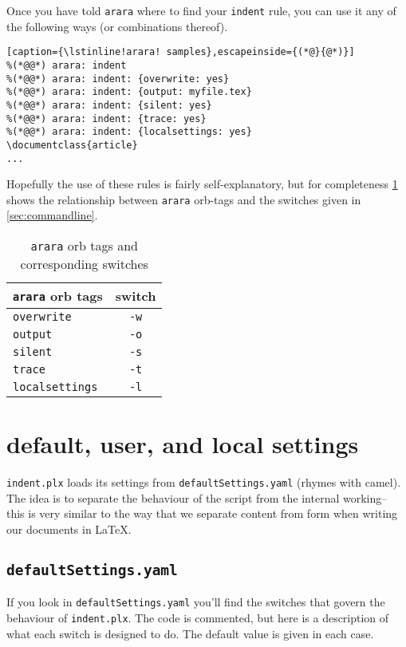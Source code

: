 \documentclass[11pt]{article}
\begin{document}
Once you have told \lstinline!arara! where to find your \lstinline!indent! rule, 
you can use it any of the following ways (or combinations thereof). 

\begin{lstlisting}[caption={\lstinline!arara! samples},escapeinside={(*@}{@*)}]
%(*@@*) arara: indent
%(*@@*) arara: indent: {overwrite: yes}
%(*@@*) arara: indent: {output: myfile.tex}
%(*@@*) arara: indent: {silent: yes}
%(*@@*) arara: indent: {trace: yes}
%(*@@*) arara: indent: {localsettings: yes}
\documentclass{article}
...
\end{lstlisting}

Hopefully the use of these rules is fairly self-explanatory, but for completeness
\cref{tab:orbsandswitches} shows the relationship between \lstinline!arara! orb-tags and the 
switches given in \cref{sec:commandline}.

\begin{table}[!ht]
	\centering
	\caption{\lstinline!arara! orb tags and corresponding switches}
	\label{tab:orbsandswitches}
	\begin{tabular}{lc}
		\toprule
		\lstinline!arara! orb tags & switch         \\
		\midrule
		\lstinline!overwrite!      & \lstinline!-w! \\
		\lstinline!output!         & \lstinline!-o! \\
		\lstinline!silent!         & \lstinline!-s! \\
		\lstinline!trace!          & \lstinline!-t! \\
		\lstinline!localsettings!  & \lstinline!-l! \\
		\bottomrule
	\end{tabular}
\end{table}
\section{default, user, and local settings}\label{sec:defuseloc}
\lstinline!indent.plx! loads its settings from \lstinline!defaultSettings.yaml! 
(rhymes with camel). The idea is to separate the behaviour of the script 
from the internal working-- this is very similar to the way that we separate content
from form when writing our documents in \LaTeX.


\subsection{\lstinline!defaultSettings.yaml!}
If you look in \lstinline!defaultSettings.yaml! you'll find the switches 
that govern the behaviour of \lstinline!indent.plx!. The code is commented, 
but here is a description of what each switch is designed to do. The default 
value is given in each case.
\end{document}
